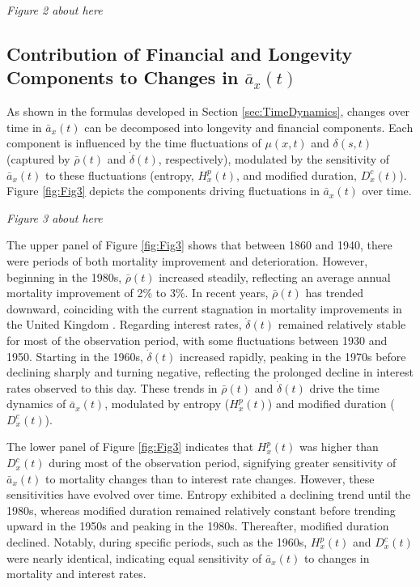 \documentclass[12pt]{article}
\begin{document}
\begin{center}
	\textit{Figure 2 about here}
\end{center}

\subsection{Contribution of Financial and Longevity Components to Changes in $\bar{a}_x(t)$}

As shown in the formulas developed in Section \ref{sec:TimeDynamics}, changes over time in $\bar{a}_x(t)$ can be decomposed into longevity and financial components. Each component is influenced by the time fluctuations of $\mu(x,t)$ and $\delta(s,t)$ (captured by $\bar{\rho}(t)$ and $\dot{\delta}(t)$, respectively), modulated by the sensitivity of $\bar{a}_x(t)$ to these fluctuations (entropy, ${H}^{p}_x(t)$, and modified duration, ${D}^{c}_x(t)$). Figure \ref{fig:Fig3} depicts the components driving fluctuations in $\bar{a}_x(t)$ over time.

\begin{center}
	\textit{Figure 3 about here}
\end{center}

The upper panel of Figure \ref{fig:Fig3} shows that between 1860 and 1940, there were periods of both mortality improvement and deterioration. However, beginning in the 1980s, $\bar{\rho}(t)$ increased steadily, reflecting an average annual mortality improvement of 2\% to 3\%. In recent years, $\bar{\rho}(t)$ has trended downward, coinciding with the current stagnation in mortality improvements in the United Kingdom \citep{djeundje2022slowdown}. Regarding interest rates, $\dot{\delta}(t)$ remained relatively stable for most of the observation period, with some fluctuations between 1930 and 1950. Starting in the 1960s, $\dot{\delta}(t)$ increased rapidly, peaking in the 1970s before declining sharply and turning negative, reflecting the prolonged decline in interest rates observed to this day. These trends in $\bar{\rho}(t)$ and $\dot{\delta}(t)$ drive the time dynamics of $\bar{a}_x(t)$, modulated by entropy (${H}^{p}_x(t)$) and modified duration (${D}^{c}_x(t)$).

The lower panel of Figure \ref{fig:Fig3} indicates that ${H}^{p}_x(t)$ was higher than ${D}^{c}_x(t)$ during most of the observation period, signifying greater sensitivity of $\bar{a}_x(t)$ to mortality changes than to interest rate changes. However, these sensitivities have evolved over time. Entropy exhibited a declining trend until the 1980s, whereas modified duration remained relatively constant before trending upward in the 1950s and peaking in the 1980s. Thereafter, modified duration declined. Notably, during specific periods, such as the 1960s, ${H}^{p}_x(t)$ and ${D}^{c}_x(t)$ were nearly identical, indicating equal sensitivity of $\bar{a}_x(t)$ to changes in mortality and interest rates.
\end{document}
